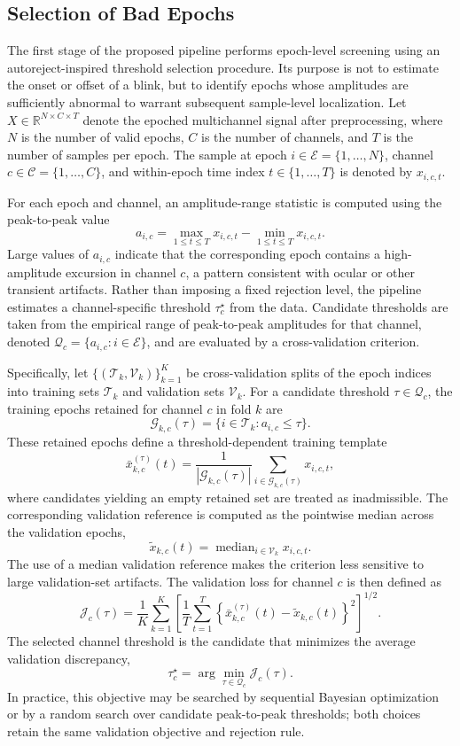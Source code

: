 \subsection{Selection of Bad Epochs}

The first stage of the proposed pipeline performs epoch-level screening using an
autoreject-inspired threshold selection procedure. Its purpose is not to estimate
the onset or offset of a blink, but to identify epochs whose amplitudes are
sufficiently abnormal to warrant subsequent sample-level localization. Let
\(X \in \mathbb{R}^{N \times C \times T}\) denote the epoched multichannel
signal after preprocessing, where \(N\) is the number of valid epochs, \(C\) is
the number of channels, and \(T\) is the number of samples per epoch. The sample
at epoch \(i \in \mathcal{E}=\{1,\ldots,N\}\), channel
\(c \in \mathcal{C}=\{1,\ldots,C\}\), and within-epoch time index
\(t \in \{1,\ldots,T\}\) is denoted by \(x_{i,c,t}\).

For each epoch and channel, an amplitude-range statistic is computed using the
peak-to-peak value
\[
a_{i,c}
= \max_{1 \leq t \leq T} x_{i,c,t}
- \min_{1 \leq t \leq T} x_{i,c,t}.
\]
Large values of \(a_{i,c}\) indicate that the corresponding epoch contains a
high-amplitude excursion in channel \(c\), a pattern consistent with ocular or
other transient artifacts. Rather than imposing a fixed rejection level, the
pipeline estimates a channel-specific threshold \(\tau_c^\star\) from the data.
Candidate thresholds are taken from the empirical range of peak-to-peak
amplitudes for that channel, denoted
\(\mathcal{Q}_c=\{a_{i,c}: i \in \mathcal{E}\}\), and are evaluated by a
cross-validation criterion.

Specifically, let \(\{(\mathcal{T}_k,\mathcal{V}_k)\}_{k=1}^{K}\) be
cross-validation splits of the epoch indices into training sets
\(\mathcal{T}_k\) and validation sets \(\mathcal{V}_k\). For a candidate
threshold \(\tau \in \mathcal{Q}_c\), the training epochs retained for channel
\(c\) in fold \(k\) are
\[
\mathcal{G}_{k,c}(\tau)
= \{ i \in \mathcal{T}_k : a_{i,c} \leq \tau \}.
\]
These retained epochs define a threshold-dependent training template
\[
\bar{x}^{(\tau)}_{k,c}(t)
= \frac{1}{|\mathcal{G}_{k,c}(\tau)|}
\sum_{i \in \mathcal{G}_{k,c}(\tau)} x_{i,c,t},
\]
where candidates yielding an empty retained set are treated as inadmissible. The
corresponding validation reference is computed as the pointwise median across
the validation epochs,
\[
\tilde{x}_{k,c}(t)
= \operatorname{median}_{i \in \mathcal{V}_k} x_{i,c,t}.
\]
The use of a median validation reference makes the criterion less sensitive to
large validation-set artifacts. The validation loss for channel \(c\) is then
defined as
\[
\mathcal{J}_{c}(\tau)
= \frac{1}{K}\sum_{k=1}^{K}
\left[
\frac{1}{T}\sum_{t=1}^{T}
\left\{\bar{x}^{(\tau)}_{k,c}(t)-\tilde{x}_{k,c}(t)\right\}^{2}
\right]^{1/2}.
\]
The selected channel threshold is the candidate that minimizes the average
validation discrepancy,
\[
\tau_c^\star
= \arg\min_{\tau \in \mathcal{Q}_c} \mathcal{J}_{c}(\tau).
\]
In practice, this objective may be searched by sequential Bayesian optimization
or by a random search over candidate peak-to-peak thresholds; both choices
retain the same validation objective and rejection rule.


